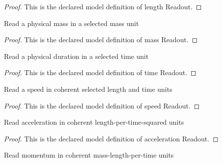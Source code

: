 \begin{proof}
  This is the declared model definition of length Readout.
\end{proof}
\begin{definition}
  \label{def:physics:phyx-mini-0655:phyxminiproblems-problemphyxmini0655-massreadout}
  Read a physical mass in a selected mass unit
\end{definition}
\begin{proof}
  This is the declared model definition of mass Readout.
\end{proof}
\begin{definition}
  \label{def:physics:phyx-mini-0655:phyxminiproblems-problemphyxmini0655-timereadout}
  Read a physical duration in a selected time unit
\end{definition}
\begin{proof}
  This is the declared model definition of time Readout.
\end{proof}
\begin{definition}
  \label{def:physics:phyx-mini-0655:phyxminiproblems-problemphyxmini0655-speedreadout}
  Read a speed in coherent selected length and time units
\end{definition}
\begin{proof}
  This is the declared model definition of speed Readout.
\end{proof}
\begin{definition}
  \label{def:physics:phyx-mini-0655:phyxminiproblems-problemphyxmini0655-accelerationreadout}
  Read acceleration in coherent length-per-time-squared units
\end{definition}
\begin{proof}
  This is the declared model definition of acceleration Readout.
\end{proof}
\begin{definition}
  \label{def:physics:phyx-mini-0655:phyxminiproblems-problemphyxmini0655-momentumreadout}
  Read momentum in coherent mass-length-per-time units
\end{definition}
